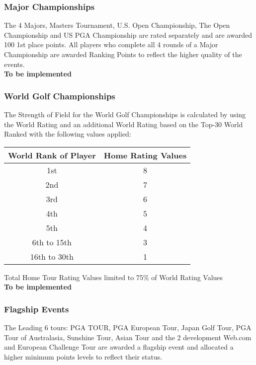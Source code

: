 \documentclass{article}
\begin{document}
\subsubsection{Major Championships}

The 4 Majors, Masters Tournament, U.S. Open Championship, The Open Championship and US PGA Championship are rated separately and are awarded 100 1st place points. All players who complete all 4 rounds of a Major Championship are awarded Ranking Points to reflect the higher quality of the events.\\
\textbf{\color{orange} To be implemented}

\subsubsection{World Golf Championships}

The Strength of Field for the World Golf Championships is calculated by using the World Rating and an additional World Rating based on the Top-30 World Ranked with the following values applied:
\begin{center}
\begin{tabular}{ | c | c | }
\hline
World Rank of Player&	Home Rating Values\\
\hline
1st	&8\\
2nd	&7\\
3rd	&6\\
4th	&5\\
5th	&4\\
6th to 15th	&3\\
16th to 30th	&1\\
\hline
\end{tabular}
\end{center}

Total Home Tour Rating Values limited to 75\% of World Rating Values\\
\textbf{\color{orange} To be implemented}

\subsubsection{Flagship Events}

The Leading 6 tours:  PGA TOUR, PGA European Tour, Japan Golf Tour, PGA Tour of Australasia, Sunshine Tour, Asian Tour and the 2 development Web.com and European Challenge Tour are awarded a flagship event and allocated a higher minimum points levels to reflect their status.
\end{document}
